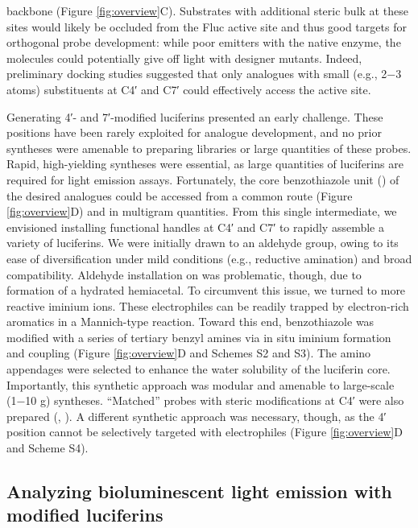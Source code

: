 backbone (Figure \ref{fig:overview}C). Substrates with additional steric bulk at
these sites would likely be occluded from the Fluc active site
and thus good targets for orthogonal probe development: while
poor emitters with the native enzyme, the molecules could
potentially give off light with designer mutants. Indeed,
preliminary docking studies suggested that only analogues
with small (e.g., 2−3 atoms) substituents at C4′ and C7′ could
effectively access the active site.
\par
Generating 4′- and 7′-modified luciferins presented an early
challenge. These positions have been rarely exploited for
analogue development, and no prior syntheses were amenable
to preparing libraries or large quantities of these probes. Rapid,
high-yielding syntheses were essential, as large quantities of
luciferins are required for light emission assays. Fortunately, the
core benzothiazole unit () of the desired analogues could
be accessed from a common route (Figure \ref{fig:overview}D) and in
multigram quantities.\cite{McCutcheon:2012ixb,RN172} From this single intermediate, we
envisioned installing functional handles at C4′ and C7′ to
rapidly assemble a variety of luciferins. We were initially drawn
to an aldehyde group, owing to its ease of diversification under
mild conditions (e.g., reductive amination) and broad
compatibility. Aldehyde installation on  was problematic,
though, due to formation of a hydrated hemiacetal.\cite{Jones:1981cm} To circumvent this issue, we turned to more reactive
iminium ions. These electrophiles can be readily trapped by
electron-rich aromatics in a Mannich-type reaction.\cite{Phillips:1956fo} Toward this end, benzothiazole  was modified with a series of tertiary
benzyl amines via in situ iminium formation and coupling
(Figure \ref{fig:overview}D and Schemes S2 and S3). The amino appendages
were selected to enhance the water solubility of the luciferin
core. Importantly, this synthetic approach was modular and
amenable to large-scale (1−10 g) syntheses. “Matched” probes
with steric modifications at C4′ were also prepared (, ). A
different synthetic approach was necessary, though, as the 4′
position cannot be selectively targeted with electrophiles
(Figure \ref{fig:overview}D and Scheme S4).

\subsection*{Analyzing bioluminescent light emission with modified luciferins}

